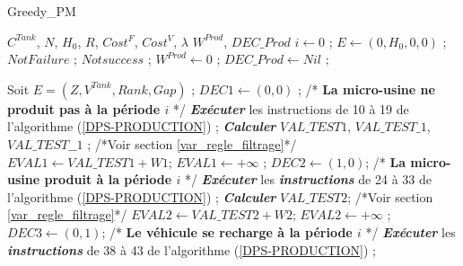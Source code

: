 \begin{algorithm}
	\caption{Greedy\_PM}
	\label{Greedy-PM}
	\begin{algorithmic}[1]
		\REQUIRE $C^{Tank}$, $N$, $H_0$, $R$, $Cost^F$, $Cost^V$, $\lambda$
		\ENSURE $W^{Prod}$, $DEC\_Prod$
		\hline
		\vspace{0.5cm}
		\INITIALISATION
		\STATE $i \leftarrow 0$ ; $E \leftarrow  (0, H_0, 0, 0)$ ; $Not Failure$ ; $Not success$ ;
		\STATE $W^{Prod} \leftarrow 0$ ; $DEC\_Prod \leftarrow Nil$ ;
		
		\vspace{0.3cm}
		
		\BOUCLEPRINCIPAL
		\vspace{0.2cm}
		\STATE Soit $E= (Z,V^{Tank},Rank,Gap)$ ;
		\STATE $DEC1 \leftarrow (0, 0)$ ; /* \textbf{La micro-usine ne produit pas à la période $i$} */
		\STATE \textit{\textbf{Exécuter}}  les instructions de 10 à 19 de l'algorithme (\ref{DPS-PRODUCTION}) ;
		\STATE \textit{\textbf{Calculer}} $VAL\_TEST1$, $VAL\_TEST\_1$,$VAL\_TEST\_\_1$ ; /*Voir section \ref{var_regle_filtrage}*/
		\STATE $EVAL1 \leftarrow VAL\_TEST1 + W1$;
		\ELSE
		\STATE $EVAL1 \leftarrow + \infty$ ;
		\ENDIF
		\STATE $DEC2 \leftarrow (1, 0)$; /* \textbf{La micro-usine produit à la période $i$} */
		\STATE \textit{\textbf{Exécuter}} les \textit{\textbf{instructions}} de 24 à 33 de l'algorithme (\ref{DPS-PRODUCTION}) ;
		\STATE \textit{\textbf{Calculer}} $VAL\_TEST2$; /*Voir section \ref{var_regle_filtrage}*/
		\STATE  $EVAL2 \leftarrow VAL\_TEST2 + W2$;
		\ELSE
		\STATE $EVAL2 \leftarrow + \infty$ ;
		\ENDIF
		\STATE $DEC3 \leftarrow (0, 1)$; /* \textbf{Le véhicule se recharge à la période $i$} */
		\STATE \textit{\textbf{Exécuter}} les \textit{\textbf{instructions}} de 38 à 43 de l'algorithme (\ref{DPS-PRODUCTION}) ;

\end{algorithmic}
\end{algorithm}
